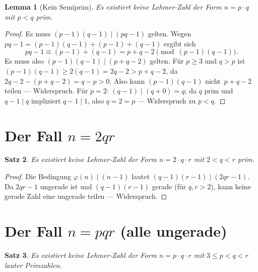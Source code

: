 \documentclass[12pt,a4paper]{amsart}
\newtheorem{theorem}{Satz}[section]
\newtheorem{lemma}[theorem]{Lemma}
\theoremstyle{definition}
\newcommand{\euler}{\varphi}
\begin{document}
\begin{lemma}[Kein Semiprim]
\label{lem:semiprim}
Es existiert keine Lehmer-Zahl der Form $n = p \cdot q$ mit $p < q$ prim.
\end{lemma}

\begin{proof}
Es muss $(p-1)(q-1) \mid (pq - 1)$ gelten.
Wegen $pq - 1 = (p-1)(q-1) + (p-1) + (q-1)$ ergibt sich
\[
  pq - 1 \equiv (p-1) + (q-1) = p + q - 2 \pmod{(p-1)(q-1)}.
\]
Es muss also $(p-1)(q-1) \mid (p + q - 2)$ gelten.
Für $p \ge 3$ und $q > p$ ist $(p-1)(q-1) \ge 2(q-1) = 2q - 2 > p + q - 2$,
da $2q - 2 - (p + q - 2) = q - p > 0$. Also kann $(p-1)(q-1)$ nicht~$p + q - 2$
teilen — Widerspruch. Für $p = 2$: $(q-1) \mid (q + 0) = q$; da $q$ prim und
$q - 1 \mid q$ impliziert $q - 1 \mid 1$, also $q = 2 = p$ — Widerspruch zu $p < q$.
\end{proof}

\section{Der Fall \texorpdfstring{$n = 2qr$}{n = 2qr}}
\label{sec:gerade}

\begin{theorem}
\label{thm:2qr}
Es existiert keine Lehmer-Zahl der Form $n = 2 \cdot q \cdot r$
mit $2 < q < r$ prim.
\end{theorem}

\begin{proof}
Die Bedingung $\euler(n) \mid (n-1)$ lautet $(q-1)(r-1) \mid (2qr - 1)$.
Da $2qr - 1$ ungerade ist und $(q-1)(r-1)$ gerade (für $q, r > 2$), kann keine
gerade Zahl eine ungerade teilen — Widerspruch.
\end{proof}

\section{Der Fall \texorpdfstring{$n = pqr$}{n = pqr} (alle ungerade)}
\label{sec:ungerade}

\begin{theorem}
\label{thm:pqr}
Es existiert keine Lehmer-Zahl der Form $n = p \cdot q \cdot r$
mit $3 \le p < q < r$ lauter Primzahlen.
\end{theorem}
\end{document}
